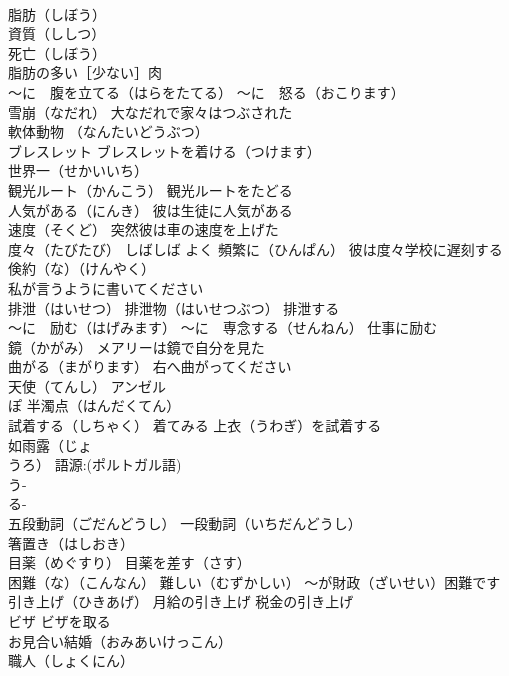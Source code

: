 \documentclass[8pt]{extreport}
\begin{document}
\begin{CJK}{UTF8}{min}
\\	脂肪（しぼう）
\\	資質（ししつ）
\\	死亡（しぼう）
\\	脂肪の多い［少ない］肉
\\	～に　腹を立てる（はらをたてる） ～に　怒る（おこります）
\\	雪崩（なだれ） 大なだれで家々はつぶされた
\\	軟体動物 （なんたいどうぶつ）
\\	ブレスレット ブレスレットを着ける（つけます）
\\	世界一（せかいいち）
\\	観光ルート（かんこう） 観光ルートをたどる
\\	人気がある（にんき） 彼は生徒に人気がある
\\	速度（そくど） 突然彼は車の速度を上げた
\\	度々（たびたび） しばしば よく 頻繁に（ひんぱん） 彼は度々学校に遅刻する
\\	倹約（な）（けんやく）
\\	私が言うように書いてください
\\	排泄（はいせつ） 排泄物（はいせつぶつ） 排泄する
\\	～に　励む（はげみます） ～に　専念する（せんねん） 仕事に励む
\\	鏡（かがみ） メアリーは鏡で自分を見た
\\	曲がる（まがります） 右へ曲がってください
\\	天使（てんし） アンゼル
\\	ぽ	半濁点（はんだくてん）
\\	試着する（しちゃく） 着てみる 上衣（うわぎ）を試着する
\\	如雨露（じょ
\\	うろ） 語源:(ポルトガル語) 
\\	う-
\\	る-
\\	五段動詞（ごだんどうし） 一段動詞（いちだんどうし）
\\	箸置き（はしおき）
\\	目薬（めぐすり） 目薬を差す（さす）
\\	困難（な）（こんなん） 難しい（むずかしい） ～が財政（ざいせい）困難です
\\	引き上げ（ひきあげ） 月給の引き上げ 税金の引き上げ
\\	ビザ ビザを取る
\\	お見合い結婚（おみあいけっこん）
\\	職人（しょくにん）

\end{CJK}
\end{document}
